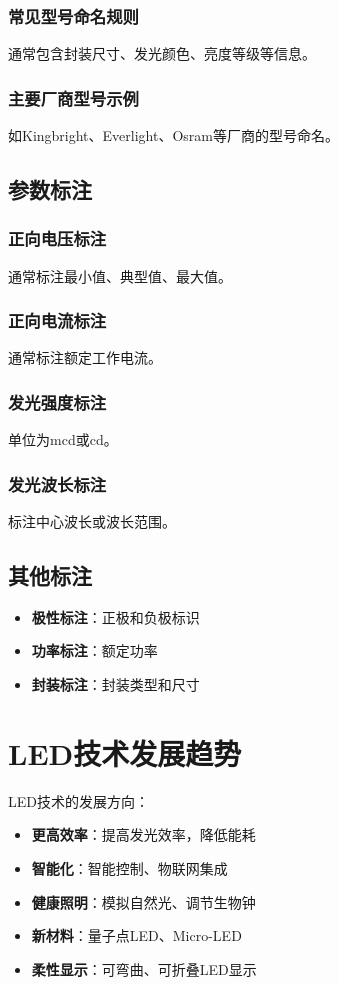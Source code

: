 \subsubsection{常见型号命名规则}
通常包含封装尺寸、发光颜色、亮度等级等信息。

\subsubsection{主要厂商型号示例}
如Kingbright、Everlight、Osram等厂商的型号命名。

\subsection{参数标注}

\subsubsection{正向电压标注}
通常标注最小值、典型值、最大值。

\subsubsection{正向电流标注}
通常标注额定工作电流。

\subsubsection{发光强度标注}
单位为mcd或cd。

\subsubsection{发光波长标注}
标注中心波长或波长范围。

\subsection{其他标注}
\begin{itemize}
    \item \textbf{极性标注}：正极和负极标识
    \item \textbf{功率标注}：额定功率
    \item \textbf{封装标注}：封装类型和尺寸
\end{itemize}

\section{LED技术发展趋势}
\label{sec:led_trends}

LED技术的发展方向：

\begin{itemize}
    \item \textbf{更高效率}：提高发光效率，降低能耗
    \item \textbf{智能化}：智能控制、物联网集成
    \item \textbf{健康照明}：模拟自然光、调节生物钟
    \item \textbf{新材料}：量子点LED、Micro-LED
    \item \textbf{柔性显示}：可弯曲、可折叠LED显示
\end{itemize}
